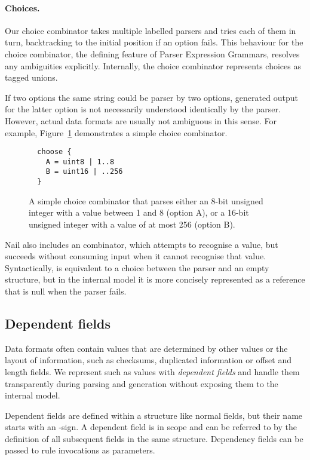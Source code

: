 \paragraph{Choices.}
Our choice combinator takes multiple labelled parsers and tries each of them in turn, backtracking
to the initial position if an option fails. This behaviour for the choice combinator, the defining
feature of Parser Expression Grammars\cite{ford2002packrat}, resolves any ambiguities explicitly.
Internally, the choice combinator represents choices as tagged unions. 

If two options the same string could be parser by two options, generated output for the latter
option is not necessarily understood identically by the parser. However, actual data formats are
usually not ambiguous in this sense.
For example, Figure~\ref{fig:choice} demonstrates a simple choice
combinator.

\begin{figure}[h!]
\smaller[0.5]
\begin{verbatim}
  choose {
    A = uint8 | 1..8
    B = uint16 | ..256
  }
\end{verbatim}
\caption{A simple choice combinator that parses either an 8-bit unsigned
integer with a value between 1 and 8 (option A), or a 16-bit unsigned
integer with a value of at most 256 (option B).}
\label{fig:choice}
\end{figure}

Nail also includes an  combinator, which attempts to recognise a value, but succeeds
without consuming input when it cannot recognise that value. Syntactically,  is
equivalent to a choice between the parser and an empty structure, but in the internal model it is
more concisely represented as a reference that is null when the parser fails.



\subsection{Dependent fields}

Data formats often contain values that are determined by other values or the layout of information,
such as checksums, duplicated information  or offset and  length fields.
We represent such as values with \emph{dependent fields} and handle them transparently during
parsing and generation without exposing them to the internal model. 


Dependent fields are defined within a structure like normal fields, but their name starts with an \@-sign. 
A dependent field is in scope and can be referred to by the definition of all subsequent fields in
the same structure. Dependency fields can be passed to rule invocations as parameters.

